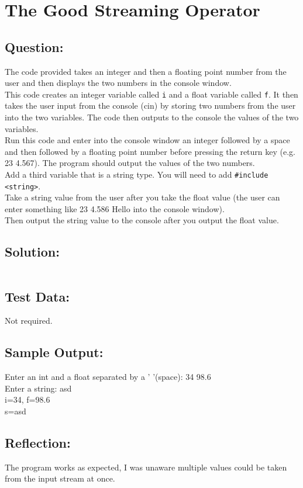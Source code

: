\documentclass[Lab-B.tex]{subfiles}
\begin{document}
    \section{The Good Streaming Operator}
        \subsection*{Question:}
        The code provided takes an integer and then a floating point number from the user and then displays the two numbers in the console window. \\
        
        This code creates an integer variable called \texttt{i} and a float variable called \texttt{f}. 
        It then takes the user input from the console (cin) by storing two numbers from the user into the two variables. 
        The code then outputs to the console the values of the two variables. \\
        
        Run this code and enter into the console window an integer followed by a space and then followed by a floating point number before pressing the return key (e.g. 23  4.567). 
        The program should output the values of the two numbers.\\

        Add a third variable that is a string type. You will need to add \texttt{#include <string>}.\\

        Take a string value from the user after you take the float value (the user can enter something like 23  4.586  Hello into the console window).\\

        Then output the string value to the console after you output the float value.\\
            
        \subsection*{Solution:}
            \inputminted{cpp}{../01-Good-Streaming/Good-Streaming.cpp}%

        \subsection*{Test Data:}
            Not required.
        
        \subsection*{Sample Output:}
            Enter an int and a float separated by a ' '(space): 34 98.6\\
            Enter a string: asd\\
            i=34, f=98.6\\
            s=asd\\      

        \subsection*{Reflection:}
            The program works as expected, I was unaware multiple values could be taken
            from the input stream at once.
\end{document}
